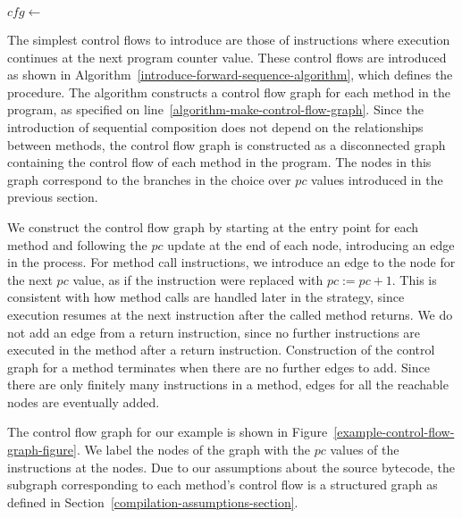 \begin{algorithm}
  \begin{algorithmic}[1]
    \State $cfg \gets$ 
    \label{algorithm-make-control-flow-graph}
    \label{algorithm-sequence-cfg-loop}
    \label{algorithm-forward-sequence-condition}
    \State {}
    \label{algorithm-forward-sequence-application}
    \EndWhile
    \EndFor
  \end{algorithmic}
  \caption{}
  \label{introduce-forward-sequence-algorithm}
\end{algorithm}
The simplest control flows to introduce are those of instructions
where execution continues at the next program counter value.
These control flows are introduced as shown in
Algorithm~\ref{introduce-forward-sequence-algorithm}, which defines
the  procedure.
The algorithm constructs a control flow graph for each method in the
program, as specified on line~\ref{algorithm-make-control-flow-graph}.
Since the introduction of sequential composition does not depend on
the relationships between methods, the control flow graph is
constructed as a disconnected graph containing the control flow of
each method in the program.
The nodes in this graph correspond to the branches in the choice over
$pc$ values introduced in the previous section.

We construct the control flow graph by starting at the entry point for
each method and following the $pc$ update at the end of each node,
introducing an edge in the process.
For method call instructions, we introduce an edge to the node for the
next $pc$ value, as if the instruction were replaced with
$pc := pc + 1$.
This is consistent with how method calls are handled later in the
strategy, since execution resumes at the next instruction after the
called method returns.
We do not add an edge from a return instruction, since no further
instructions are executed in the method after a return instruction.
Construction of the control graph for a method terminates when there
are no further edges to add.
Since there are only finitely many instructions in a method, edges for
all the reachable nodes are eventually added.

The control flow graph for our example is shown in
Figure~\ref{example-control-flow-graph-figure}.
We label the nodes of the graph with the $pc$ values of the
instructions at the nodes.
Due to our assumptions about the source bytecode, the subgraph
corresponding to each method's control flow is a structured graph as
defined in Section~\ref{compilation-assumptions-section}.

